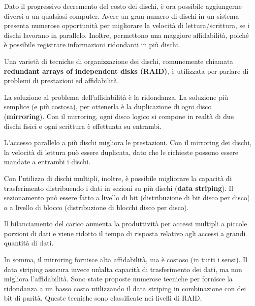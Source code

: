 \documentclass[a4paper]{article}
\begin{document}
Dato il progressivo decremento del costo dei dischi, è ora possibile aggiungerne diversi a un qualsiasi computer. Avere un gran numero di dischi in un sistema presenta numerose opportunità per migliorare la velocità di lettura/scrittura, se i dischi lavorano in parallelo. Inoltre, permettono una maggiore affidabilità, poiché è possibile registrare informazioni ridondanti in più dischi.

Una varietà di tecniche di organizzazione dei dischi, comunemente chiamata \textbf{redundant arrays of independent disks (RAID)}, è utilizzata per parlare di problemi di prestazioni ed affidabilità.

La soluzione al problema dell'affidabilità è la ridondanza. La soluzione più semplice (e più costosa), per ottenerla è la duplicazione di ogni disco (\textbf{mirroring}). Con il mirroring, ogni disco logico si compone in realtà di due dischi fisici e ogni scrittura è effettuata su entrambi.

L'accesso parallelo a più dischi migliora le prestazioni. Con il mirroring dei dischi, la velocità di lettura può essere duplicata, dato che le richieste possono essere mandate a entrambi i dischi.

Con l'utilizzo di dischi multipli, inoltre, è possibile migliorare la capacità di trasferimento distribuendo i dati in sezioni su più dischi (\textbf{data striping}). Il sezionamento può essere fatto a livello di bit (distribuzione di bit disco per disco) o a livello di blocco (distribuzione di blocchi disco per disco).

Il bilanciamento del carico aumenta la produttività per accessi multipli a piccole porzioni di dati e viene ridotto il tempo di risposta relativo agli accessi a grandi quantità di dati.

In somma, il mirroring fornisce alta affidabilità, ma è costoso (in tutti i sensi). Il data striping assicura invece unìalta capacità di trasferimento dei dati, ma non migliora l'affidabilità. Sono state proposte numerose tecniche per fornisce la ridondanza a un basso costo utilizzando il data striping in combinazione con dei bit di parità. Queste tecniche sono classificate nei livelli di RAID.
\end{document}
